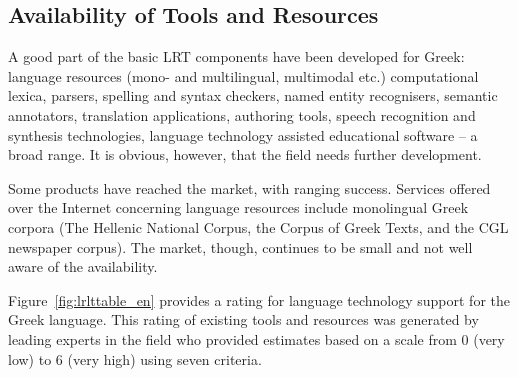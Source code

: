 \begin{multicols}{2}
\subsection{Availability of Tools and Resources}

A good part of the basic LRT components have been developed for Greek: language resources (mono- and multilingual, multimodal etc.) computational lexica, parsers, spelling and syntax checkers, named entity recognisers, semantic annotators, translation applications, authoring tools, speech recognition and synthesis technologies, language technology assisted educational software -- a broad range. It is obvious, however, that the field needs further development.

Some products have reached the market, with ranging success. Services offered over the Internet concerning language resources include monolingual Greek corpora (The Hellenic National Corpus, the Corpus of Greek Texts, and the CGL newspaper corpus). The market, though, continues to be small and not well aware of the availability.

Figure~\ref{fig:lrlttable_en} provides a rating for language technology support for the Greek language. This rating of existing tools and resources was generated by leading experts in the field who provided estimates based on a scale from 0 (very low) to 6 (very high) using seven criteria.


\end{multicols}
